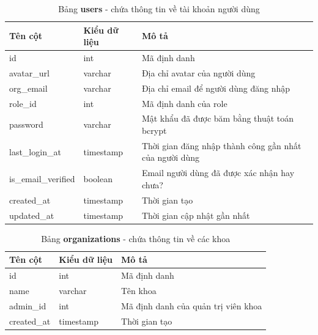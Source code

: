 \documentclass[./../main.tex]{subfiles}
\begin{document}
\begin{table}[H]
	\caption[Bảng users]{Bảng \textbf{users} - chứa thông tin về tài khoản người dùng}
	\label{tab:db_users}
	\begin{tabularx}{\textwidth}{|l|l|X|}
	\hline
	\textbf{Tên cột}    & \textbf{Kiểu dữ liệu} & \textbf{Mô tả}                                         \\ \hline
	id                  & int                   & Mã định danh                                           \\ \hline
	avatar\_url         & varchar               & Địa chỉ avatar của người dùng                          \\ \hline
	org\_email          & varchar               & Địa chỉ email để người dùng đăng nhập                  \\ \hline
	role\_id            & int                   & Mã định danh của role                                  \\ \hline
	password            & varchar               & Mật khẩu đã được băm bằng thuật toán bcrypt            \\ \hline
	last\_login\_at     & timestamp             & Thời gian đăng nhập thành công gần nhất của người dùng \\ \hline
	is\_email\_verified & boolean               & Email người dùng đã được xác nhận hay chưa?            \\ \hline
	created\_at         & timestamp             & Thời gian tạo                                          \\ \hline
	updated\_at         & timestamp             & Thời gian cập nhật gần nhất                            \\ \hline
	\end{tabularx}
\end{table}

\begin{table}[H]
	\caption[Bảng organizations]{Bảng \textbf{organizations} - chứa thông tin về các khoa}
	\label{tab:db_organizations}
	\begin{tabular}{|l|l|l|}
	\hline
	\textbf{Tên cột} & \textbf{Kiểu dữ liệu} & \textbf{Mô tả}                      \\ \hline
	id               & int                   & Mã định danh                        \\ \hline
	name             & varchar               & Tên khoa                            \\ \hline
	admin\_id        & int                   & Mã định danh của quản trị viên khoa \\ \hline
	created\_at      & timestamp             & Thời gian tạo                       \\ \hline
	\end{tabular}
\end{table}
\end{document}
